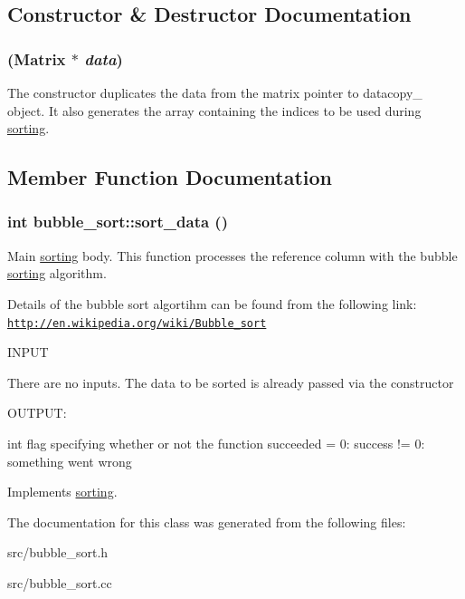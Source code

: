 \subsection{Constructor \& Destructor Documentation}
\hypertarget{classbubble__sort_aa413fc87fd7b9a0da354c0da0bfc0fa2}{
\subsubsection[{bubble\_\-sort}]{ ({\bf Matrix} $\ast$ {\em data})}}
\label{dc/d2f/classbubble__sort_aa413fc87fd7b9a0da354c0da0bfc0fa2}
The constructor duplicates the data from the matrix pointer to datacopy\_\- object. It also generates the array containing the indices to be used during \hyperlink{classsorting}{sorting}. 

\subsection{Member Function Documentation}
\hypertarget{classbubble__sort_a8fdc845adc8e24bbb169b79ef5140ee2}{
\subsubsection[{sort\_\-data}]{\setlength{\rightskip}{0pt plus 5cm}int bubble\_\-sort::sort\_\-data ()}}
\label{dc/d2f/classbubble__sort_a8fdc845adc8e24bbb169b79ef5140ee2}


Main \hyperlink{classsorting}{sorting} body. This function processes the reference column with the bubble \hyperlink{classsorting}{sorting} algorithm.

Details of the bubble sort algortihm can be found from the following link: \href{http://en.wikipedia.org/wiki/Bubble_sort}{\tt http://en.wikipedia.org/wiki/Bubble\_\-sort}

\begin{DoxyVerb}
  INPUT

  There are no inputs. The data to be sorted is already passed via the constructor

  OUTPUT:

  int         flag specifying whether or not the function succeeded
               = 0: success
	      != 0: something went wrong

  \end{DoxyVerb}
 

Implements \hyperlink{classsorting_a94c4b729732743299f3dcd2505312381}{sorting}.

The documentation for this class was generated from the following files:\begin{DoxyCompactItemize}
\item 
src/bubble\_\-sort.h\item 
src/bubble\_\-sort.cc\end{DoxyCompactItemize}
